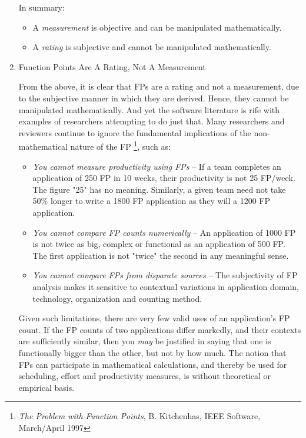 \documentclass{article}
\begin{document}
\begin{enumerate}
In summary:

\begin{itemize}
\item A \emph{measurement} is objective and can be manipulated mathematically.
\item A \emph{rating} is subjective and cannot be manipulated mathematically.
\end{itemize}

\item Function Points Are A Rating, Not A Measurement
\label{sec:orgheadline382}

From the above, it is clear that FPs are a rating and not a measurement,
due to the subjective manner in which they are derived. Hence, they
cannot be manipulated mathematically. And yet the software literature is
rife with examples of researchers attempting to do just that. Many
researchers and reviewers continue to ignore the fundamental
implications of the non-mathematical nature of the FP \footnote{\emph{The Problem with Function Points}, B. Kitchenhas, IEEE Software,
March/April 1997}, such as:

\begin{itemize}
\item \emph{You cannot measure productivity using FPs} -- If a team completes an
application of 250 FP in 10 weeks, their productivity is not 25
FP/week. The figure "25" has no meaning. Similarly, a given team need
not take 50\% longer to write a 1800 FP application as they will a
1200 FP application.\\
\item \emph{You cannot compare FP counts numerically} -- An application of 1000
FP is not twice as big, complex or functional as an application of
500 FP. The first application is not "twice" the second in any
meaningful sense.\\
\item \emph{You cannot compare FPs from disparate sources} -- The subjectivity
of FP analysis makes it sensitive to contextual variations in
application domain, technology, organization and counting method.
\end{itemize}

Given such limitations, there are very few valid uses of an
application's FP count. If the FP counts of two applications differ
markedly, and their contexts are sufficiently similar, then you \emph{may} be
justified in saying that one is functionally bigger than the other, but
not by how much. The notion that FPs can participate in mathematical
calculations, and thereby be used for scheduling, effort and
productivity measures, is without theoretical or empirical basis.


\end{enumerate}
\end{document}
